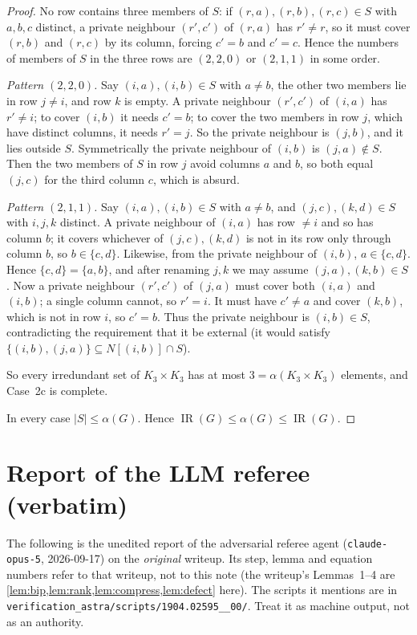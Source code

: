 \documentclass[11pt,a4paper]{article}
\theoremstyle{plain}
\theoremstyle{definition}
\theoremstyle{remark}
\newcommand{\IR}{\operatorname{IR}}
\begin{document}
\begin{proof}
No row contains three members of $S$: if $(r,a),(r,b),(r,c)\in S$ with $a,b,c$ distinct, a private neighbour $(r',c')$ of $(r,a)$ has $r'\ne r$, so it must cover $(r,b)$ and $(r,c)$ by its column, forcing $c'=b$ and $c'=c$. Hence the numbers of members of $S$ in the three rows are $(2,2,0)$ or $(2,1,1)$ in some order.

\emph{Pattern $(2,2,0)$.} Say $(i,a),(i,b)\in S$ with $a\ne b$, the other two members lie in row $j\ne i$, and row $k$ is empty. A private neighbour $(r',c')$ of $(i,a)$ has $r'\ne i$; to cover $(i,b)$ it needs $c'=b$; to cover the two members in row $j$, which have distinct columns, it needs $r'=j$. So the private neighbour is $(j,b)$, and it lies outside $S$. Symmetrically the private neighbour of $(i,b)$ is $(j,a)\notin S$. Then the two members of $S$ in row $j$ avoid columns $a$ and $b$, so both equal $(j,c)$ for the third column $c$, which is absurd.

\emph{Pattern $(2,1,1)$.} Say $(i,a),(i,b)\in S$ with $a\ne b$, and $(j,c),(k,d)\in S$ with $i,j,k$ distinct. A private neighbour of $(i,a)$ has row $\ne i$ and so has column $b$; it covers whichever of $(j,c),(k,d)$ is not in its row only through column $b$, so $b\in\{c,d\}$. Likewise, from the private neighbour of $(i,b)$, $a\in\{c,d\}$. Hence $\{c,d\}=\{a,b\}$, and after renaming $j,k$ we may assume $(j,a),(k,b)\in S$. Now a private neighbour $(r',c')$ of $(j,a)$ must cover both $(i,a)$ and $(i,b)$; a single column cannot, so $r'=i$. It must have $c'\ne a$ and cover $(k,b)$, which is not in row $i$, so $c'=b$. Thus the private neighbour is $(i,b)\in S$, contradicting the requirement that it be external (it would satisfy $\{(i,b),(j,a)\}\subseteq N[(i,b)]\cap S$).

So every irredundant set of $K_3\times K_3$ has at most $3=\alpha(K_3\times K_3)$ elements, and Case~2c is complete.

In every case $|S|\le\alpha(G)$. Hence $\IR(G)\le\alpha(G)\le\IR(G)$.
\end{proof}

\section{Report of the LLM referee (verbatim)}\label{app:referee}

\begin{tcolorbox}[colback=gray!8,colframe=gray!50,boxrule=0.4pt,arc=2pt]
\small The following is the unedited report of the adversarial referee agent (\texttt{claude-opus-5}, 2026-09-17) on the \emph{original} writeup. Its step, lemma and equation numbers refer to that writeup, not to this note (the writeup's Lemmas~1--4 are \cref{lem:bip,lem:rank,lem:compress,lem:defect} here). The scripts it mentions are in \nolinkurl{verification_astra/scripts/1904.02595__00/}. Treat it as machine output, not as an authority.
\end{tcolorbox}
\end{document}
